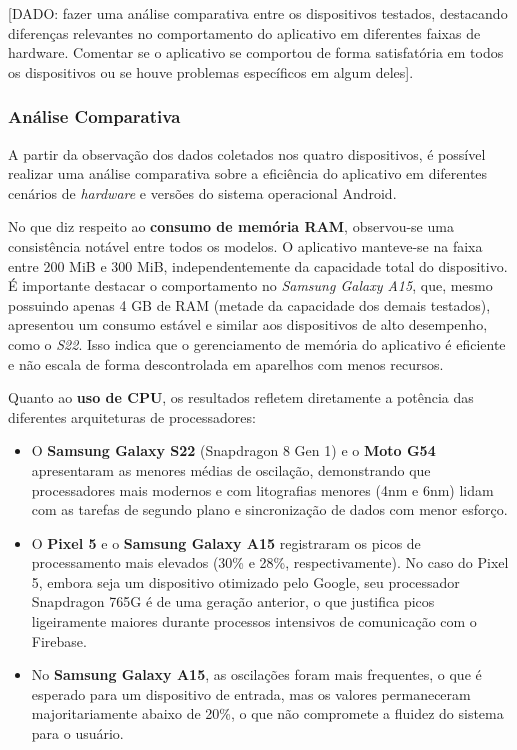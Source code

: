[DADO: fazer uma análise comparativa entre os dispositivos testados, destacando diferenças relevantes no comportamento do aplicativo em diferentes faixas de hardware. Comentar se o aplicativo se comportou de forma satisfatória em todos os dispositivos ou se houve problemas específicos em algum deles].

\subsubsection{Análise Comparativa}

A partir da observação dos dados coletados nos quatro dispositivos, é possível realizar uma análise comparativa sobre a eficiência do aplicativo em diferentes cenários de \textit{hardware} e versões do sistema operacional Android.

No que diz respeito ao \textbf{consumo de memória RAM}, observou-se uma consistência notável entre todos os modelos. O aplicativo manteve-se na faixa entre 200 MiB e 300 MiB, independentemente da capacidade total do dispositivo. É importante destacar o comportamento no \textit{Samsung Galaxy A15}, que, mesmo possuindo apenas 4 GB de RAM (metade da capacidade dos demais testados), apresentou um consumo estável e similar aos dispositivos de alto desempenho, como o \textit{S22}. Isso indica que o gerenciamento de memória do aplicativo é eficiente e não escala de forma descontrolada em aparelhos com menos recursos.

Quanto ao \textbf{uso de CPU}, os resultados refletem diretamente a potência das diferentes arquiteturas de processadores:
\begin{itemize}
    \item O \textbf{Samsung Galaxy S22} (Snapdragon 8 Gen 1) e o \textbf{Moto G54} apresentaram as menores médias de oscilação, demonstrando que processadores mais modernos e com litografias menores (4nm e 6nm) lidam com as tarefas de segundo plano e sincronização de dados com menor esforço.
    \item O \textbf{Pixel 5} e o \textbf{Samsung Galaxy A15} registraram os picos de processamento mais elevados (30\% e 28\%, respectivamente). No caso do Pixel 5, embora seja um dispositivo otimizado pelo Google, seu processador Snapdragon 765G é de uma geração anterior, o que justifica picos ligeiramente maiores durante processos intensivos de comunicação com o Firebase.
    \item No \textbf{Samsung Galaxy A15}, as oscilações foram mais frequentes, o que é esperado para um dispositivo de entrada, mas os valores permaneceram majoritariamente abaixo de 20\%, o que não compromete a fluidez do sistema para o usuário.
\end{itemize}


